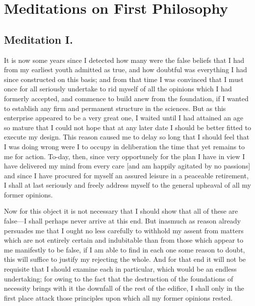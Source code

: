 
\author{Ren\'e Descartes}
\chapter[Meditations on First Philosophy, 1 and 2]{Meditations on
First Philosophy}

\section{Meditation I.}

\begin{abstract}{c} Of the things which may be brought within the
sphere of the doubtful. \end{abstract}

\noindent It is now some years since I detected how many were the
false beliefs that I had from my earliest youth admitted as true, and
how doubtful was everything I had since constructed on this basis; and
from that time I was convinced that I must once for all seriously
undertake to rid myself of all the opinions which I had formerly
accepted, and commence to build anew from the foundation, if I wanted
to establish any firm and permanent structure in the sciences. But as
this enterprise appeared to be a very great one, I waited until I had
attained an age so mature that I could not hope that at any later date
I should be better fitted to execute my design. This reason caused me
to delay so long that I should feel that I was doing wrong were I to
occupy in deliberation the time that yet remains to me for action.
To-day, then, since very opportunely for the plan I have in view I
have delivered my mind from every care [and am happily agitated by no
passions] and since I have procured for myself an assured leisure in a
peaceable retirement, I shall at last seriously and freely address
myself to the general upheaval of all my former opinions.

Now for this object it is not necessary that I should show
that all of these are false---I shall perhaps never arrive at this
end. But inasmuch as reason already persuades me that I ought no less
carefully to withhold my assent from matters which are not entirely
certain and indubitable than from those which appear to me
manifestly to be false, if I am able to find in each one some reason
to doubt, this will suffice to justify my rejecting the whole. And for
that end it will not be requisite that I should examine each in
particular, which would be an endless undertaking; for owing to the
fact that the destruction of the foundations of necessity brings with
it the downfall of the rest of the edifice, I shall only in the first
place attack those principles upon which all my former opinions
rested.

